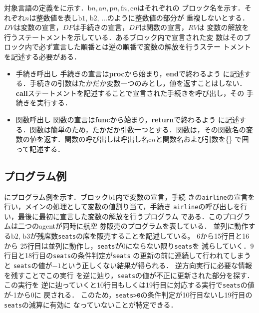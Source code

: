\documentclass[submit,PRO]{ipsj}
\newcommand{\blabel}[1]{\mathrm{b}#1}
\newcommand{\plabel}[1]{\mathrm{p}#1}
\newcommand{\clabel}[1]{\mathrm{c}#1}
\newcommand{\flabel}[1]{\mathrm{f}#1}
\newcommand{\alabel}[1]{\mathrm{a}#1}
\begin{document}
対象言語の定義をに示す．$\blabel{n}, \alabel{n}, \plabel{n}, \flabel{n}, \clabel{n}$はそれぞれの
ブロック名を示す．それぞれ$n$は整数値を表し$\blabel{1}$, $\blabel{2}$, $\ldots$のように整数値の部分が
重複しないとする．$DV$は変数の宣言，$DP$は手続きの宣言，$DF$は関数の宣言，$RV$は%
変数の解放を行うステートメントを示している．あるブロック内で宣言された変
数はそのブロック内で必ず宣言した順番とは逆の順番で変数の解放を行うステー
トメントを記述する必要がある．

\begin{itemize}
\item
手続き呼出し 手続きの宣言は{\bf proc}から始まり，{\bf end}で終わるよう
     に記述する．手続きの引数はたかだか変数一つのみとし，値を返すことはしない．
     {\bf call}ステートメントを記述することで宣言された手続きを呼び出し，その
     手続きを実行する．
\item
関数呼出し 関数の宣言は{\bf func}から始まり，{\bf return}で終わるよう
     に記述する．関数は簡単のため，たかだか引数一つとする．関数は，その関数名の変数の値を返す．関数の呼び出しは呼出し名$\clabel{n}$と関数名および引数を\{\}
     で囲って記述する．
\end{itemize}

\subsection{プログラム例}

にプログラム例を示す．ブロックb1内で変数の宣言，手続
きの\verb:airline:の宣言を行い，メインの処理として変数の値割り当て，手続き
\verb:airline:の呼び出しを行い，最後に最初に宣言した変数の解放を行うプログラム
である．このプログラムは二つのagentが同時に航空
券販売のプログラムを表している．
並列に動作する$\blabel{2}$, $\blabel{3}$が残席数\verb:seats:の席を販売することを記述している。
6から15行目と16から
25行目は並列に動作し，\verb;seats;が0にならない限り\verb;seats;を
減らしていく．9行目と18行目の\verb;seats;の条件判定が\verb;seats;
の更新の前に連続して行われてしまうと
\verb;seats;の値が$-1$という正しくない結果が得られる．
逆方向実行に必要な情報を残すことでこの実行
を逆に辿り，\verb;seats;の値が不正に更新された部分を探す．この実行を
逆に辿っていくと10行目もしくは19行目に対応する実行で\verb;seats;の値が-1から0に
戻される．
このため，\verb|seats>0|の条件判定が10行目ないし19行目の\verb|seats|の減算に有効に
なっていないことが特定できる．
\end{document}
